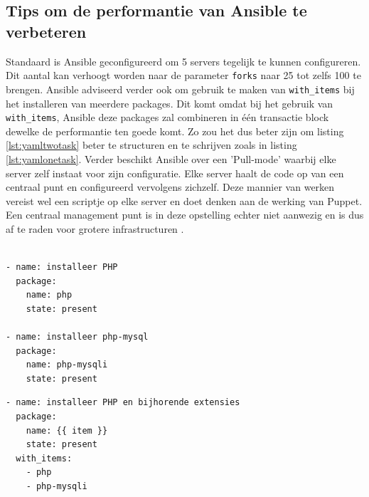  \subsection{Tips om de performantie van Ansible te verbeteren}
 Standaard is Ansible geconfigureerd om 5 servers tegelijk te kunnen configureren. Dit aantal kan verhoogt worden naar de parameter \texttt{\gls{fork}s} naar 25 tot zelfs 100 te brengen. \newline
Ansible adviseerd verder ook om gebruik te maken van \texttt{with\_items} bij het installeren van meerdere packages. Dit komt omdat bij het gebruik van \texttt{with\_items}, Ansible deze packages zal combineren in \'e\'en transactie block dewelke de performantie ten goede komt. Zo zou het dus beter zijn om listing \ref{lst:yamltwotask} beter te structuren en te schrijven zoals in listing \ref{lst:yamlonetask}. \newline
Verder beschikt Ansible over een 'Pull-mode' waarbij elke server zelf instaat voor zijn configuratie. Elke server haalt de code op van een centraal punt en configureerd vervolgens zichzelf. Deze mannier van werken vereist wel een scriptje op elke server en doet denken aan de werking van Puppet. Een centraal management punt is in deze opstelling echter niet aanwezig en is dus af te raden voor grotere infrastructuren \autocite{AnsibleTuning} .

\begin{lstlisting}[frame=single]

- name: installeer PHP
  package:
    name: php
    state: present

- name: installeer php-mysql
  package:
    name: php-mysqli
    state: present
\end{lstlisting}

\begin{lstlisting}[frame=single]
- name: installeer PHP en bijhorende extensies
  package:
    name: {{ item }}
    state: present
  with_items:
    - php
    - php-mysqli
\end{lstlisting}

  
  
